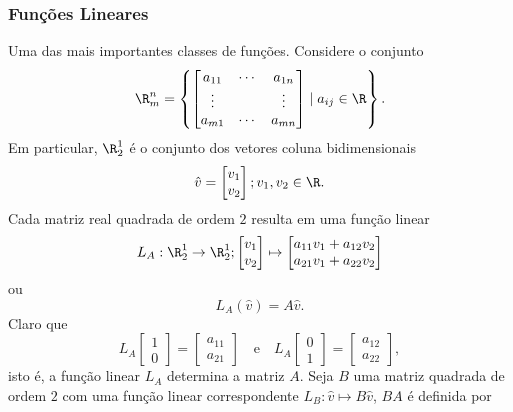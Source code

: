       \subsubsection{Funções Lineares}
         Uma das mais importantes classes de funções. Considere o conjunto $$ \R_{m}^{n} = \left\{
         \begin{bmatrix}
            a_{11} & \cdots & a_{1n} \\
            \vdots &  & \vdots \\
            a_{m1} & \cdots & a_{mn}
         \end{bmatrix}
         \mid a_{ij} \in \R \right\}.$$
         Em particular, $\R_{2}^{1}$ é o conjunto dos vetores coluna bidimensionais $$\hat{v} = 
         \begin{bmatrix}
            v_{1} \\
            v_{2}
         \end{bmatrix}; v_{1}, v_{2} \in \R.$$
         Cada matriz real quadrada de ordem $2$ resulta em uma função linear $$ L_{A}:\R_{2}^{1} \to \R_{2}^{1}; 
         \begin{bmatrix}
            v_{1} \\
            v_{2}
         \end{bmatrix}
         \mapsto 
         \begin{bmatrix}
            a_{11}v_{1} + a_{12}v_{2} \\
            a_{21}v_{1} + a_{22}v_{2}
         \end{bmatrix}$$
         ou $$L_{A}\left(\hat{v}\right) = A\hat{v}.$$
         Claro que $$L_{A} 
         \begin{bmatrix}
            1 \\
            0
         \end{bmatrix} =
         \begin{bmatrix}
            a_{11} \\
            a_{21}
         \end{bmatrix} \quad \textrm{e} \quad L_{A} 
         \begin{bmatrix}
            0 \\
            1
         \end{bmatrix} =
         \begin{bmatrix}
            a_{12} \\
            a_{22}
         \end{bmatrix},$$
         isto é, a função linear $L_{A}$ determina a matriz $A$. Seja $B$ uma matriz quadrada de ordem $2$ com uma função linear correspondente $L_{B}: \hat{v}\mapsto B\hat{v}$, $BA$ é definida por
